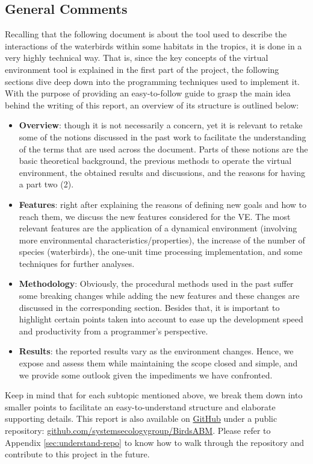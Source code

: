\subsection{General Comments}
Recalling that the following document is about the tool used to describe the interactions of the waterbirds within some habitats in the tropics, it is done in a very highly technical way. That is, since the key concepts of the virtual environment tool is explained in the first part of the project, the following sections dive deep down into the programming techniques used to implement it. With the purpose of providing an easy-to-follow guide to grasp the main idea behind the writing of this report, an overview of its structure is outlined below:
\begin{itemize}
    \item \textbf{Overview}: though it is not necessarily a concern, yet it is relevant to retake some of the notions discussed in the past work to facilitate the understanding of the terms that are used across the document. Parts of these notions are the basic theoretical background, the previous methods to operate the virtual environment, the obtained results and discussions, and the reasons for having a part two (2).
    \item \textbf{Features}: right after explaining the reasons of defining new goals and how to reach them, we discuss the new features considered for the VE. The most relevant features are the application of a dynamical environment (involving more environmental characteristics/properties), the increase of the number of species (waterbirds), the one-unit time processing implementation, and some techniques for further analyses.
    \item \textbf{Methodology}: Obviously, the procedural methods used in the past suffer some breaking changes while adding the new features and these changes are discussed in the corresponding section. Besides that, it is important to highlight certain points taken into account to ease up the development speed and productivity from a programmer's perspective.
    \item \textbf{Results}: the reported results vary as the environment changes. Hence, we expose and assess them while maintaining the scope closed and simple, and we provide some outlook given the impediments we have confronted.
\end{itemize}

Keep in mind that for each subtopic mentioned above, we break them down into smaller points to facilitate an easy-to-understand structure and elaborate supporting details. This report is also available on \href{https://github.com/}{GitHub} under a public repository: \href{https://github.com/systemsecologygroup/BirdsABM}{github.com/systemsecologygroup/BirdsABM}. Please refer to Appendix \ref{sec:understand-repo} to know how to walk through the repository and contribute to this project in the future.
